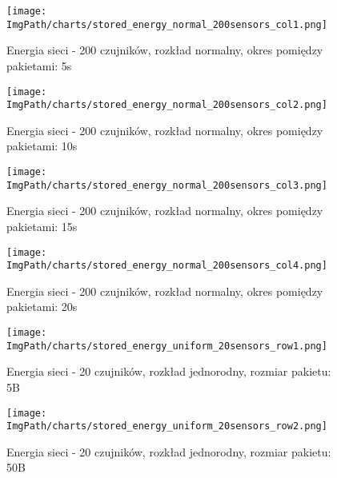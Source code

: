 \documentclass[a4paper,12pt,twoside,openany]{report}
\newcommand{\ImgPath}{./img}
\begin{document}
\begin{figure}[H]
	\begin{center}
		\texttt{[image: \\ImgPath/charts/stored\_energy\_normal\_200sensors\_col1.png]}
	\end{center}
	\caption{Energia sieci - 200 czujników, rozkład normalny, okres pomiędzy pakietami: 5s}
\end{figure}

\begin{figure}[H]
	\begin{center}
		\texttt{[image: \\ImgPath/charts/stored\_energy\_normal\_200sensors\_col2.png]}
	\end{center}
	\caption{Energia sieci - 200 czujników, rozkład normalny, okres pomiędzy pakietami: 10s}
\end{figure}

\begin{figure}[H]
	\begin{center}
		\texttt{[image: \\ImgPath/charts/stored\_energy\_normal\_200sensors\_col3.png]}
	\end{center}
	\caption{Energia sieci - 200 czujników, rozkład normalny, okres pomiędzy pakietami: 15s}
\end{figure}

\begin{figure}[H]
	\begin{center}
		\texttt{[image: \\ImgPath/charts/stored\_energy\_normal\_200sensors\_col4.png]}
	\end{center}
	\caption{Energia sieci - 200 czujników, rozkład normalny, okres pomiędzy pakietami: 20s}
\end{figure}

\begin{figure}[H]
	\begin{center}
		\texttt{[image: \\ImgPath/charts/stored\_energy\_uniform\_20sensors\_row1.png]}
	\end{center}
	\caption{Energia sieci - 20 czujników, rozkład jednorodny, rozmiar pakietu: 5B}
\end{figure}

\begin{figure}[H]
	\begin{center}
		\texttt{[image: \\ImgPath/charts/stored\_energy\_uniform\_20sensors\_row2.png]}
	\end{center}
	\caption{Energia sieci - 20 czujników, rozkład jednorodny, rozmiar pakietu: 50B}
\end{figure}
\end{document}
